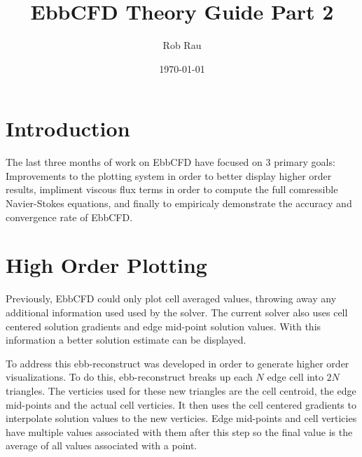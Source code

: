 \documentclass[12pt,parskip=full]{article}
\numberwithin{subsection}{section}
\begin{document}
	\vspace{-4ex}
	\title{EbbCFD Theory Guide Part 2\vspace{-3.5ex}}
	\author{Rob Rau\vspace{-4ex}}
	\date{\today\vspace{-4ex}}
	\maketitle

	\section{Introduction}
		The last three months of work on EbbCFD have focused on 3 primary goals: Improvements to the plotting system in order to
		better display higher order results, impliment viscous flux terms in order to compute the full comressible Navier-Stokes 
		equations, and finally to empiricaly demonstrate the accuracy and convergence rate of EbbCFD.

	\section{High Order Plotting}
		Previously, EbbCFD could only plot cell averaged values, throwing away any additional information used used by the solver.
		The current solver also uses cell centered solution gradients and edge mid-point solution values. With this information
		a better solution estimate can be displayed.
		
		To address this ebb-reconstruct was developed in order to generate higher order visualizations. To do this, ebb-reconstruct
		breaks up each $N$ edge cell into $2N$ triangles. The verticies used for these new triangles are the cell centroid, the edge
		mid-points and the actual cell verticies. It then uses the cell centered gradients to interpolate solution values to the new
		verticies. Edge mid-points and cell verticies have multiple values associated with them after this step so the final value is
		the average of all values associated with a point.
\end{document}
